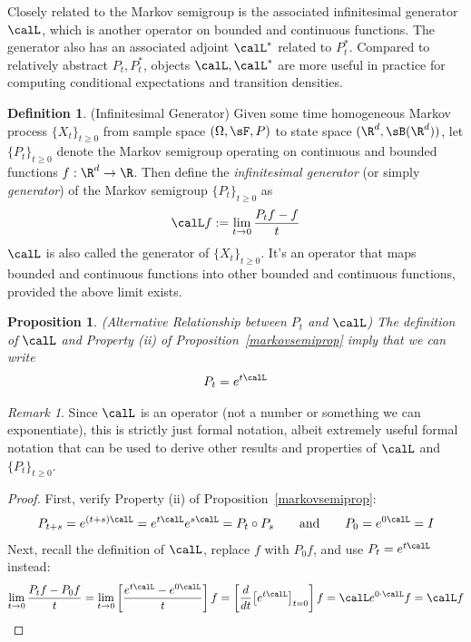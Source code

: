 \documentclass[12pt]{article}
\theoremstyle{plain}
\newtheorem{prop}[thm]{Proposition}
\theoremstyle{definition}
\newtheorem{defn}[thm]{Definition}
\theoremstyle{remark}
\newtheorem*{rmk}{Remark}
\newcommand{\ra}{\rightarrow}
\begin{document}
Closely related to the Markov semigroup is the associated infinitesimal
generator $\calL$, which is another operator on bounded and continuous
functions. The generator also has an associated adjoint $\calL^*$
related to $P_t^*$. Compared to relatively abstract $P_t,P_t^*$,
objects $\calL,\calL^*$ are more useful in practice for computing
conditional expectations and transition densities.

\begin{defn}(Infinitesimal Generator)
Given some time homogeneous Markov process $\{X_t\}_{t\geq 0}$ from
sample space $(\Omega,\sF,P)$ to state space $(\R^d,\sB(\R^d))$, let
$\{P_t\}_{t\geq 0}$ denote the Markov semigroup operating on continuous
and bounded functions $f:\R^d\ra\R$.
Then define the \emph{infinitesimal generator} (or simply
\emph{generator}) of the Markov semigroup $\{P_t\}_{t\geq 0}$ as
\begin{align*}
  \calL f
  :=
  \lim_{t\ra 0}
  \frac{P_tf-f}{t}
\end{align*}
$\calL$ is also called the generator of $\{X_t\}_{t\geq 0}$.
It's an operator that
maps bounded and continuous functions into other bounded and
continuous functions, provided the above limit exists.
\end{defn}

\begin{prop}\emph{(Alternative Relationship between $P_t$ and $\calL$)}
\label{PtcalL}
The definition of $\calL$ and Property (ii) of
Proposition~\ref{markovsemiprop} imply that we can write
\begin{align*}
  P_t = e^{t\calL}
\end{align*}
\end{prop}
\begin{rmk}
Since $\calL$ is an operator (not a number or something we can
exponentiate), this is strictly just formal notation, albeit extremely
useful formal notation that can be used to derive other results and
properties of $\calL$ and $\{P_t\}_{t\geq 0}$.
\end{rmk}
\begin{proof}
First, verify Property (ii) of Proposition~\ref{markovsemiprop}:
\begin{align*}
  P_{t+s}
  =
  e^{(t+s)\calL}
  =
  e^{t\calL}
  e^{s\calL}
  =
  P_t\circ P_s
  \qquad\text{and}\qquad
  P_0
  = e^{0\calL} = I
\end{align*}
Next, recall the definition of $\calL$, replace $f$ with $P_0f$, and use
$P_t=e^{t\calL}$ instead:
\begin{align*}
  \lim_{t\ra 0}
  \frac{P_tf-P_0f}{t}
  =
  \lim_{t\ra 0}
  \left[
  \frac{e^{t\calL}-e^{0\calL}}{t}
  \right]
  f
  =
  \left[
  \frac{d}{dt}\big[e^{t\calL}\big]_{t=0}
  \right]
  f
  =
  \calL e^{0\cdot \calL}
  f
  = \calL f
\end{align*}
\end{proof}
\end{document}
